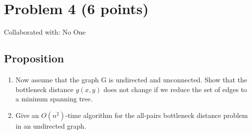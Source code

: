 \documentclass{article}
\begin{document}
\section{Problem 4 (6 points)}
Collaborated with: No One

\subsection{Proposition}
\paragraph{}

\begin{enumerate}[label= (\alph*)]
      \item Now assume that the graph G is undirected and unconnected. Show that the bottleneck
            distance \(g(x,y)\) does not change if we reduce the set of edges to a mininum spanning
            tree.
      \item Give an \(O(n^2)\)-time algorithm for the all-pairs bottleneck distance
            problem in an undirected graph.
\end{enumerate}
\end{document}
